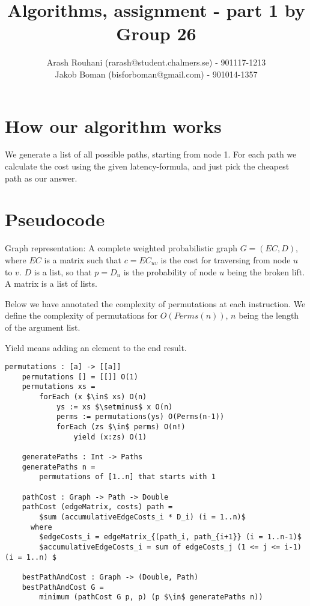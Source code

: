 \documentclass[a4paper,11pt]{article}
\title{Algorithms, assignment - part 1 by Group 26}
\author{Arash Rouhani (rarash@student.chalmers.se) - 901117-1213\\
        Jakob Boman (bisforboman@gmail.com) - 901014-1357}
\begin{document}
\maketitle

\section{How our algorithm works}
We generate a list of all possible paths, starting from node 1. For each path we calculate the cost using the given latency-formula, and just pick the cheapest path as our answer.

\section{Pseudocode}
Graph representation: A complete weighted probabilistic graph $G = (EC, D)$, where $EC$ is a
matrix such that $c = EC_{uv}$ is the cost for traversing from node $u$ to $v$.
$D$ is a list, so that $p = D_u$ is the probability of node $u$ being the broken lift.
A matrix is a list of lists.

Below we have annotated the complexity of permutations at
each instruction.
We define the complexity of permutations for $O(Perms(n))$,
$n$ being the length of the argument list.

Yield means adding an element to the end result.

\begin{lstlisting}[mathescape]
    permutations : [a] -> [[a]]
    permutations [] = [[]] O(1)
    permutations xs =
        forEach (x $\in$ xs) O(n)
            ys := xs $\setminus$ x O(n)
            perms := permutations(ys) O(Perms(n-1))
            forEach (zs $\in$ perms) O(n!)
                yield (x:zs) O(1)

    generatePaths : Int -> Paths
    generatePaths n =
        permutations of [1..n] that starts with 1

    pathCost : Graph -> Path -> Double
    pathCost (edgeMatrix, costs) path = 
        $sum (accumulativeEdgeCosts_i * D_i) (i = 1..n)$
      where
        $edgeCosts_i = edgeMatrix_{(path_i, path_{i+1}} (i = 1..n-1)$
        $accumulativeEdgeCosts_i = sum of edgeCosts_j (1 <= j <= i-1) (i = 1..n) $
    
    bestPathAndCost : Graph -> (Double, Path)
    bestPathAndCost G = 
        minimum (pathCost G p, p) (p $\in$ generatePaths n))

\end{lstlisting}
\end{document}

